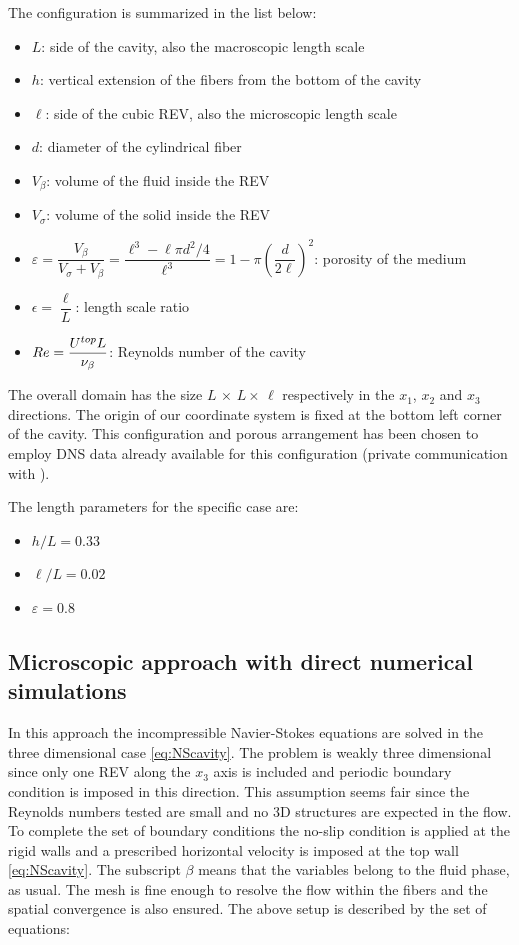 The configuration is summarized in the list below:
\begin{itemize}
	\item $L$: side of the cavity, also the macroscopic length scale
	\item $h$: vertical extension of the fibers from the bottom of the cavity 
	\item $\ell$: side of the cubic REV, also the microscopic length scale
	\item $d$: diameter of the cylindrical fiber
	\item $V_{\beta}$: volume of the fluid inside the REV
	\item $V_{\sigma}$: volume of the solid inside the REV
	\item $\varepsilon = \dfrac{V_{\beta}}{V_{\sigma} +V_{\beta}} = \dfrac{\ell^3 -\ell \pi d^2 / 4}{\ell^3} = 1 - \pi \left(\dfrac{d}{2 \ell}\right)^2$: porosity of the medium
	\item $\epsilon = \dfrac{\ell}{L}$: length scale ratio
	\item $Re= \dfrac{U^{top} L}{\nu_{\beta}}$: Reynolds number of the cavity
\end{itemize}

The overall domain has the size $L \, \times \, L \times \, \ell$ respectively in the $x_1$, $x_2$ and $x_3$ directions. The origin of our coordinate system is fixed at the bottom left corner of the cavity. 
This configuration and porous arrangement has been chosen to employ DNS data already available for this configuration (private communication with \citet{zampogna2016fluid}).

\newpage
The length parameters for the specific case are:
\begin{itemize}
	\item $h/L=0.33$
	\item $\ell/L=0.02$
	\item $\varepsilon = 0.8$
\end{itemize}

\subsection{Microscopic approach with direct numerical simulations}

In this approach the incompressible Navier-Stokes equations are solved in the three dimensional case \eqref{eq:NScavity}. 
The problem is weakly three dimensional since only one REV along the $x_3$ axis is included and periodic boundary condition is imposed in this direction.
This assumption seems fair since the Reynolds numbers tested are small and no 3D structures are expected in the flow.
To complete the set of boundary conditions the no-slip condition is applied at the rigid walls and a prescribed horizontal velocity is imposed at the top wall \eqref{eq:NScavity}. The subscript $\beta$ means that the variables belong to the fluid phase, as usual. The mesh is fine enough to resolve the flow within the fibers and the spatial convergence is also ensured. The above setup is described by the set of equations:

